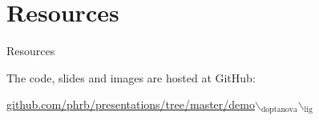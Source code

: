 \documentclass[10pt, compress, aspectratio=169, xcolor={table,usenames,dvipsnames}]{beamer}
\begin{document}
\section{Resources}
\label{sec:orgbc3b6cf}
\begin{frame}[label={sec:orgb1f3d5e}]{Resources}
\begin{center}
The code, slides and images are \alert{hosted at GitHub}:

\href{https://github.com/phrb/presentations/tree/master/demo\_doptanova\_lig}{github.com/phrb/presentations/tree/master/demo$\backslash$\(_{\text{doptanova}}\)$\backslash$\(_{\text{lig}}\)}
\end{center}
\end{frame}
\maketitle
\end{document}
